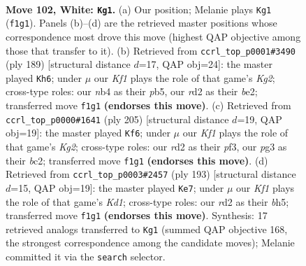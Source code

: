 \documentclass[11pt]{article}
\begin{document}
\clearpage

\begin{figure}[p]\centering
\begin{subfigure}{0.46\textwidth}\centering
\resizebox{\linewidth}{!}{%
\newchessgame
\chessboard[
  setfen={8/5pk1/6p1/4P3/1n3P2/1B4p1/3r4/5K2 w - - 2 102},
  showmover=false,
  pgfstyle=straightmove, color=movearrow, markmove={f1-g1}
]}
\caption{}
\end{subfigure}\hfill
\begin{subfigure}{0.46\textwidth}\centering
\resizebox{\linewidth}{!}{%
\newchessgame
\chessboard[
  setfen={3b4/6k1/6p1/1P3p2/7P/6PK/4B3/8 b - - 12 95},
  showmover=false,
  pgfstyle=straightmove, color=movearrow, markmove={g7-h6}
]}
\caption{}
\end{subfigure}
\\[4pt]
\begin{subfigure}{0.46\textwidth}\centering
\resizebox{\linewidth}{!}{%
\newchessgame
\chessboard[
  setfen={8/6k1/3b4/6p1/8/5PPP/2B3K1/8 b - - 24 103},
  showmover=false,
  pgfstyle=straightmove, color=movearrow, markmove={g7-f6}
]}
\caption{}
\end{subfigure}\hfill
\begin{subfigure}{0.46\textwidth}\centering
\resizebox{\linewidth}{!}{%
\newchessgame
\chessboard[
  setfen={3k4/8/3pP3/3P3B/1PK5/8/8/4b3 b - - 4 97},
  showmover=false,
  pgfstyle=straightmove, color=movearrow, markmove={d8-e7}
]}
\caption{}
\end{subfigure}
\caption{\textbf{Move 102, White: \texttt{Kg1}.} (a) Our position; Melanie plays \texttt{Kg1} (\texttt{f1g1}). Panels (b)--(d) are the retrieved master positions whose correspondence most drove this move (highest QAP objective among those that transfer to it). (b) Retrieved from \texttt{ccrl\_top\_p0001\#3490} (ply 189) [structural distance $d$=17, QAP obj=24]: the master played \texttt{Kh6}; under $\mu$ our \emph{Kf1} plays the role of that game's \emph{Kg2}; cross-type roles: our \emph{n}b4 as their \emph{p}b5, our \emph{r}d2 as their \emph{b}e2; transferred move \texttt{f1g1} \textbf{(endorses this move)}. (c) Retrieved from \texttt{ccrl\_top\_p0000\#1641} (ply 205) [structural distance $d$=19, QAP obj=19]: the master played \texttt{Kf6}; under $\mu$ our \emph{Kf1} plays the role of that game's \emph{Kg2}; cross-type roles: our \emph{r}d2 as their \emph{p}f3, our \emph{p}g3 as their \emph{b}c2; transferred move \texttt{f1g1} \textbf{(endorses this move)}. (d) Retrieved from \texttt{ccrl\_top\_p0003\#2457} (ply 193) [structural distance $d$=15, QAP obj=19]: the master played \texttt{Ke7}; under $\mu$ our \emph{Kf1} plays the role of that game's \emph{Kd1}; cross-type roles: our \emph{r}d2 as their \emph{b}h5; transferred move \texttt{f1g1} \textbf{(endorses this move)}. Synthesis: 17 retrieved analogs transferred to \texttt{Kg1} (summed QAP objective 168, the strongest correspondence among the candidate moves); Melanie committed it via the \texttt{search} selector.}
\label{fig:thought-m202}
\end{figure}
\end{document}
